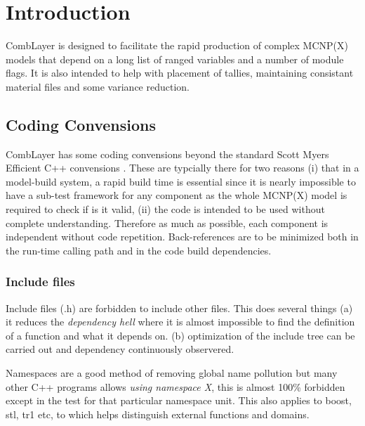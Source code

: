 \section{Introduction}

CombLayer is designed to facilitate the rapid production of complex
MCNP(X) models that depend on a long list of ranged variables and a
number of module flags. It is also intended to help with placement of tallies,
maintaining consistant material files and some variance reduction.

\subsection{Coding Convensions}

CombLayer has some coding convensions beyond the standard Scott Myers
Efficient C++ convensions \cite{Myers}. These are typcially there for
two reasons (i) that in a model-build system, a rapid build time is
essential since it is nearly impossible to have a sub-test framework for any
component as the whole MCNP(X) model is required to check if is it
valid, (ii) the code is intended to be used without complete
understanding. Therefore as much as possible, each component is
independent without code repetition. Back-references are to be minimized
both in the run-time calling path and in the code build dependencies.

\subsubsection{Include files}
\label{Sec:IntroInclude}
Include files (.h) are forbidden to include other files.
This does several things (a) it reduces the {\it dependency
  hell} where it is almost impossible to find the definition of a
function and what it depends on. (b) optimization of the include tree
can be carried out and dependency continuously observered. 

Namespaces are a good method of removing global name pollution but
many other C++ programs allows {\it using namespace X}, this is almost
100\% forbidden except in the test for that particular namespace
unit. This also applies to boost, stl, tr1 etc, to which helps
distinguish external functions and domains.


